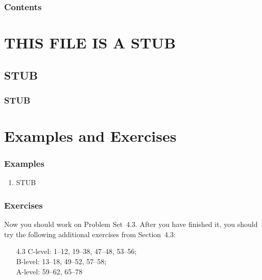 \documentclass[serif,ignorenonframetext]{beamer}
\title{\commonTitleZeroFourThree}
\subtitle{\commonSubtitleZeroFourThree}
\author{\commonAuthor}
\institute{\commonInstitute}
\date{\commonDateZeroFourThree}
\begin{document}

\begin{frame}
  \titlepage
\end{frame}


\begin{frame}
  \frametitle{Contents}
  \tableofcontents
\end{frame}

\section{THIS FILE IS A STUB}

\subsection{STUB}

\begin{frame}
  \frametitle{STUB}
\end{frame}


\section{Examples and Exercises}

\begin{frame}
  \frametitle{Examples}
  \begin{enumerate}
  \item STUB
  \end{enumerate}
\end{frame}

\begin{frame}
  \frametitle{Exercises}
  Now you should work on Problem Set~4.3.  After you have finished it,
  you should try the following additional exercises from Section~4.3:
  \begin{itemize}
  \item[4.3]
    C-level: 1--12, 19--38, 47--48, 53--56; \\
    B-level: 13--18, 49--52, 57--58; \\
    A-level: 59--62, 65--78
  \end{itemize}
\end{frame}
\end{document}

